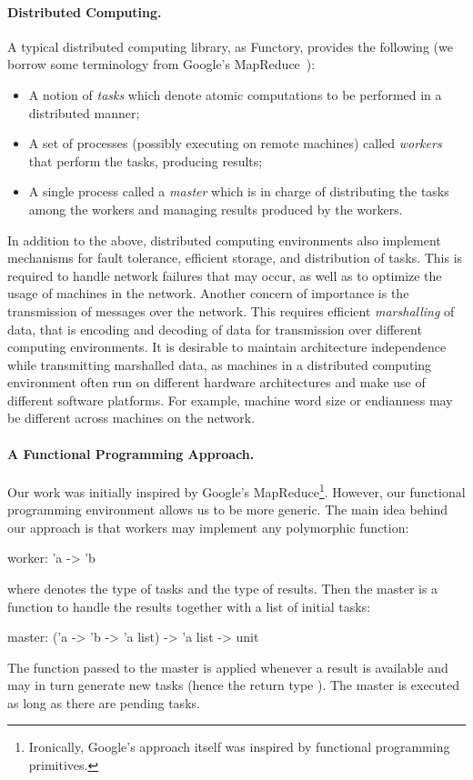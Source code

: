 \documentclass[tfpsymp,pagenumbers]{tfp07symp}
\newcommand{\functory}{\textsf{Functory}}
\begin{document}
\paragraph{Distributed Computing.}
A typical distributed computing library, as \functory,
provides the following (we
borrow some terminology from Google's MapReduce~\cite{mapreduce}):
\begin{itemize}
\item A notion of \emph{tasks} which denote atomic computations
  to be performed in a distributed manner; 
\item A set of processes (possibly executing on remote machines)
  called \emph{workers} that perform
  the tasks, producing results;
\item A single process called a \emph{master} which is in charge
  of distributing the tasks among the workers and managing results
  produced by the workers.
\end{itemize}
In addition to the above, distributed computing environments also
implement mechanisms for fault tolerance, efficient storage, and
distribution of tasks. This is required to handle network failures
that may occur, as well as to optimize the usage of machines in the
network. Another concern of importance is the transmission of messages
over the network. This requires efficient 
\emph{marshalling} of data, that is encoding and decoding of data 
for transmission over different computing environments.  It is desirable to
maintain architecture independence while transmitting marshalled data,
as machines in a distributed computing environment often run on
different hardware architectures and make use of different software
platforms. For example, machine word size or endianness may be different
across machines on the network.

\paragraph{A Functional Programming Approach.}
Our work was initially inspired by Google's
MapReduce\footnote{Ironically, Google's approach itself was inspired
  by functional programming primitives.}. However, our functional
programming environment allows us to be more generic. 
The main idea behind our approach is that
workers may implement any polymorphic function:
\begin{ocaml}
  worker: 'a -> 'b
\end{ocaml}
where  denotes the type of tasks and  the type of results.
Then the master is a
function to handle the results together with
a list of initial tasks:
\begin{ocaml}
  master: ('a -> 'b -> 'a list) -> 'a list -> unit
\end{ocaml}
The function passed to the master is applied whenever a result is
available and may in turn generate new tasks (hence the return type
).  The master is executed as long as there are pending
tasks.
\end{document}
